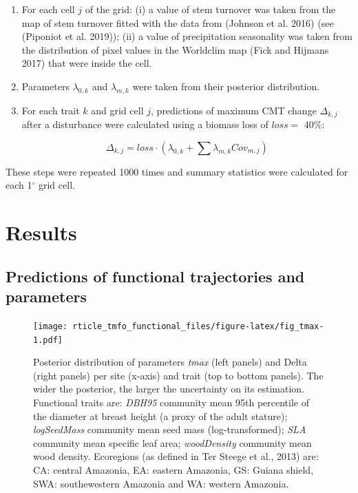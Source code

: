 \documentclass[]{elsarticle} %
\begin{document}
\begin{enumerate}
\def\labelenumi{\arabic{enumi}.}
\item
  For each cell \(j\) of the grid: (i) a value of stem turnover was
  taken from the map of stem turnover fitted with the data from (Johnson
  et al. 2016) (see (Piponiot et al. 2019)); (ii) a value of
  precipitation seasonality was taken from the distribution of pixel
  values in the Worldclim map (Fick and Hijmans 2017) that were inside
  the cell.
\item
  Parameters \(\lambda_{0,k}\) and \(\lambda_{m,k}\) were taken from
  their posterior distribution.
\item
  For each trait \(k\) and grid cell \(j\), predictions of maximum CMT
  change \(\Delta_{k,j}\) after a disturbance were calculated using a
  biomass loss of \(loss =\) 40\%:

  \begin{equation} 
  \label{eq:lambdas}
  \Delta_{k,j} = loss \cdot (\lambda_{0,k} + \sum \lambda_{m,k} Cov_{m,j}) 
  \end{equation}
\end{enumerate}

These steps were repeated 1000 times and summary statistics were
calculated for each 1\(^\circ\) grid cell.

\section{Results}\label{results}

\subsection{Predictions of functional trajectories and
parameters}\label{predictions-of-functional-trajectories-and-parameters}

\begin{figure}
\centering
\texttt{[image: rticle\_tmfo\_functional\_files/figure-latex/fig\_tmax-1.pdf]}
\caption{\label{fig:tmax_delta}Posterior distribution of parameters
\emph{tmax} (left panels) and Delta (right panels) per site (x-axis) and
trait (top to bottom panels). The wider the posterior, the larger the
uncertainty on its estimation. Functional traits are: \emph{DBH95}
community mean 95th percentile of the diameter at breast height (a proxy
of the adult stature); \emph{logSeedMass} community mean seed mass
(log-transformed); \emph{SLA} community mean specific leaf area;
\emph{woodDensity} community mean wood density. Ecoregions (as defined
in Ter Steege et al., 2013) are: CA: central Amazonia, EA: eastern
Amazonia, GS: Guiana shield, SWA: southewestern Amazonia and WA: western
Amazonia.}
\end{figure}
\end{document}
